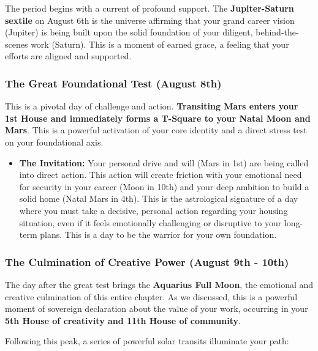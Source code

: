 \documentclass{article}
\begin{document}
The period begins with a current of profound support. The \textbf{Jupiter-Saturn sextile} on August 6th is the universe affirming that your grand career vision (Jupiter) is being built upon the solid foundation of your diligent, behind-the-scenes work (Saturn). This is a moment of earned grace, a feeling that your efforts are aligned and supported.

\subsubsection*{The Great Foundational Test (August 8th)}\label{the-great-foundational-test-august-8th}

This is a pivotal day of challenge and action. \textbf{Transiting Mars enters your 1st House and immediately forms a T-Square to your Natal Moon and Mars}. This is a powerful activation of your core identity and a direct stress test on your foundational axis.

\begin{itemize}
\tightlist
\item
  \textbf{The Invitation:} Your personal drive and will (Mars in 1st) are being called into direct action. This action will create friction with your emotional need for security in your career (Moon in 10th) and your deep ambition to build a solid home (Natal Mars in 4th). This is the astrological signature of a day where you must take a decisive, personal action regarding your housing situation, even if it feels emotionally challenging or disruptive to your long-term plans. This is a day to be the warrior for your own foundation.
\end{itemize}

\subsubsection*{The Culmination of Creative Power (August 9th - 10th)}\label{the-culmination-of-creative-power-august-9th---10th}

The day after the great test brings the \textbf{Aquarius Full Moon}, the emotional and creative culmination of this entire chapter. As we discussed, this is a powerful moment of sovereign declaration about the value of your work, occurring in your \textbf{5th House of creativity and 11th House of community}.

Following this peak, a series of powerful solar transits illuminate your path:
\end{document}
